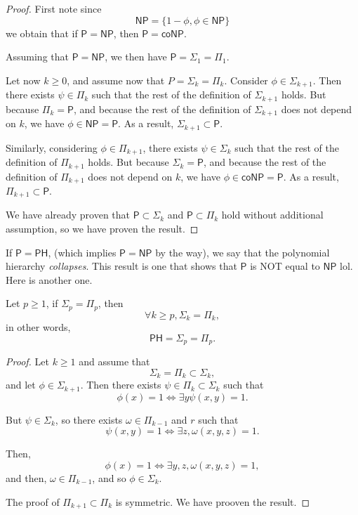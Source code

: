 \begin{proof}
    First note since
    \[
        \mathsf{NP} = \{ 1 - \phi, \phi \in \mathsf{NP} \}
    \]
    we obtain that if $ \mathsf P = \mathsf{NP} $, then $ \mathsf P = \mathsf{coNP} $.

    Assuming that $ \mathsf P = \mathsf{NP} $, we then have $ \mathsf P = \mathsf \Sigma_1 = \mathsf \Pi_1 $.

    Let now $ k \ge 0 $, and assume now that $ P = \mathsf \Sigma_k = \mathsf \Pi_k $. Consider $ \phi \in \mathsf \Sigma_{k+1} $. Then there exists $ \psi \in \mathsf \Pi_k $ such that the rest of the definition of $ \mathsf \Sigma_{k+1} $ holds. But because $ \mathsf \Pi_k = \mathsf P $, and because the rest of the definition of $ \Sigma_{k+1} $ does not depend on $ k $, we have $ \phi \in \mathsf{NP} = \mathsf P $. As a result, $ \mathsf \Sigma_{k+1} \subset \mathsf P $. 

    Similarly, considering $ \phi \in \mathsf \Pi_{k+1} $, there exists $ \psi \in \mathsf \Sigma_k $ such that the rest of the definition of $ \mathsf \Pi_{k+1} $ holds. But because $ \mathsf \Sigma_k = \mathsf P $, and because the rest of the definition of $ \Pi_{k+1} $ does not depend on $ k $, we have $ \phi \in \mathsf{coNP} = \mathsf P $. As a result, $ \mathsf \Pi_{k+1} \subset \mathsf P $.

    We have already proven that $ \mathsf P \subset \mathsf \Sigma_k $ and $ \mathsf P \subset \mathsf \Pi_k $ hold without additional assumption, so we have proven the result.
\end{proof}

If $ \mathsf P = \mathsf{PH} $, (which implies $ \mathsf{P} = \mathsf{NP} $ by the way), we say that the polynomial hierarchy \textit{collapses}. This result is one that \og shows \fg that $ \mathsf P $ is NOT equal to $ \mathsf{NP} $ lol. Here is another one.

\begin{proposition}
    Let $ p \ge 1 $, if $ \mathsf \Sigma_p = \mathsf \Pi_p $, then
    \[
        \forall k \ge p, \mathsf \Sigma_k = \mathsf \Pi_k,
    \]
    in other words,
    \[
        \mathsf{PH} = \mathsf \Sigma_p = \mathsf \Pi_p.
    \]
\end{proposition}

\begin{proof}
    Let $ k \ge 1 $ and assume that 
    \[
        \mathsf \Sigma_k = \mathsf \Pi_k \subset \mathsf \Sigma_k,
    \]
    and let $ \phi \in \Sigma_{k+1} $. Then there exists $ \psi \in \mathsf \Pi_k \subset \mathsf \Sigma_k $ such that
    \[
        \phi(x) = 1 \iff \exists y \psi(x,y) = 1.
    \]

    But $\psi \in \mathsf \Sigma_k$, so there exists $ \omega \in \mathsf \Pi_{k-1}$ and $r$ such that
    \[
        \psi(x,y) = 1 \iff \exists z, \omega(x,y,z) = 1.
    \]

    Then,
    \[
        \phi(x) = 1 \iff \exists y, z, \omega(x, y, z) = 1,
    \]
    and then, $\omega \in \Pi_{k-1}$, and so $ \phi \in \Sigma_k $.

    The proof of $\mathsf \Pi_{k+1} \subset \mathsf \Pi_k$ is symmetric. We have prooven the result.
\end{proof}

